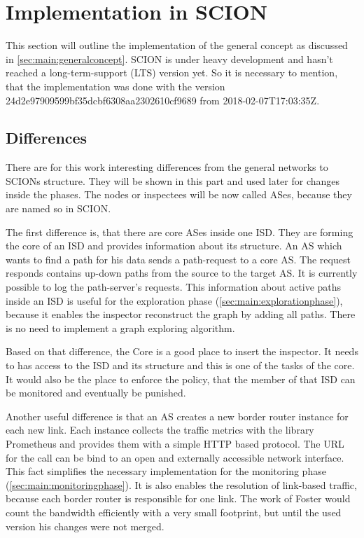 \documentclass[thesis.tex]{subfiles}
\begin{document}
\section{Implementation in SCION} \label{sec:main:scionimpl}

This section will outline the implementation of the general concept as discussed in \autoref{sec:main:generalconcept}. SCION is under heavy development and hasn't reached a long-term-support (LTS) version yet. So it is necessary to mention, that the implementation was done with the version  24d2e97909599bf35dcbf6308aa2302610cf9689 from 2018-02-07T17:03:35Z. 

\subsection{Differences}

There are for this work interesting differences from the general networks to SCIONs structure. They will be shown in this part and used later for changes inside the phases. The nodes or inspectees will be now called ASes, because they are named so in SCION.

The first difference is, that there are core ASes inside one ISD. They are forming the core of an ISD and provides information about its structure. An AS which wants to find a path for his data sends a path-request to a core AS. The request responds contains up-down paths  from the source to the target AS. It is currently possible to log the path-server's requests. This information about active paths inside an ISD is useful for the exploration phase (\autoref{sec:main:explorationphase}), because it enables the inspector reconstruct the graph by adding all paths. There is no need to implement a graph exploring algorithm.

Based on that difference, the Core is a good place to insert the inspector. It needs to has access to the ISD and its structure and this is one of the tasks of the core. It would also be the place to enforce the policy, that the member of that ISD can be monitored and eventually be punished. 

Another useful difference is that an AS creates a new border router instance for each new link. Each instance collects the traffic metrics with the library Prometheus and provides them with a simple HTTP based protocol. The URL for the call can be bind to an open and externally accessible network interface. This fact simplifies the necessary implementation for the monitoring phase (\autoref{sec:main:monitoringphase}). It is also enables the resolution of link-based traffic, because each border router is responsible for one link. The work of Foster\cite{Forster.September2017} would count the bandwidth efficiently with a very small footprint, but until the used version his changes were not merged. 
\end{document}
